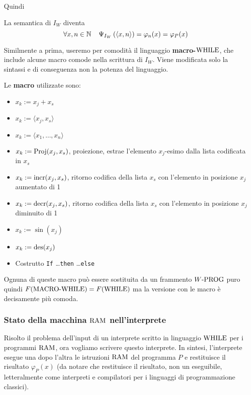 Quindi
\begin{center}
	
\end{center}

La semantica di $I_W$ diventa
$$ \forall x,n \in \mathbb{N} \;\;\;\; \Psi_{I_W} \left(\langle x,n \rangle \right) = \varphi_n (x) = \varphi_P (x) $$

Similmente a prima, useremo per comodità il linguaggio \textbf{macro-$\text{WHILE}$}, che include alcune macro comode nella scrittura di $I_W$. Viene modificata solo la sintassi e di conseguenza non la potenza del linguaggio.

Le \textbf{macro} utilizzate sono: 
\begin{itemize}
	\item $x_k := x_j + x_s$
	
    \item $x_k := \langle x_j, x_s \rangle$
	
    \item $x_k := \langle x_1, \dots, x_n \rangle$
	
    \item $x_k := \text{Proj}(x_j, x_s)$, proiezione, estrae l'elemento $x_j$-esimo dalla lista codificata in $x_s$
	
    \item $x_k := \text{incr} (x_j, x_s)$, ritorno codifica della lista $x_s$ con l'elemento in posizione $x_j$ aumentato di 1
	
    \item $x_k := \text{decr}(x_j, x_s)$, ritorno codifica della lista $x_s$ con l'elemento in posizione $x_j$ diminuito di 1
	
    \item $x_k := \sin (x_j)$
	
    \item $x_k := \operatorname{des} (x_j)$
	
    \item Costrutto \texttt{If} \dots \texttt{then} \dots \texttt{else}
\end{itemize}

Ognuna di queste macro può essere sostituita da un frammento $W\text{-PROG}$ puro quindi $F(\text{MACRO-}\text{WHILE}) = F(\text{WHILE})$ ma la versione con le macro è decisamente più comoda.

\subsubsection{Stato della macchina $\text{RAM}$ nell'interprete}

Risolto il problema dell'input di un interprete scritto in linguaggio $\text{WHILE}$ per i programmi $\text{RAM}$, ora vogliamo scrivere questo interprete. In sintesi, l'interprete esegue una dopo l'altra le istruzioni $\text{RAM}$ del programma $P$ e restituisce il risultato $\varphi_P (x)$ (da notare che restituisce il risultato, non un eseguibile, letteralmente come interpreti e compilatori per i linguaggi di programmazione classici).

